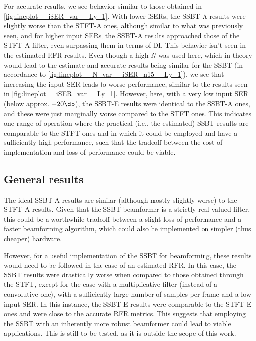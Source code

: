 For accurate results, we see behavior similar to those obtained in \cref{fig:lineplot__iSER_var__Ly_1}. With lower iSERs, the SSBT-A results were slightly worse than the STFT-A ones, although similar to what was previously seen, and for higher input SERs, the SSBT-A results approached those of the STFT-A filter, even surpassing them in terms of DI. This behavior isn't seen in the estimated RFR results. Even though a high $N$ was used here, which in theory would lead to the estimate and accurate results being similar for the SSBT (in accordance to \cref{fig:lineplot__N_var__iSER_n15__Ly_1}), we see that increasing the input SER leads to worse performance, similar to the results seen in \cref{fig:lineplot__iSER_var__Ly_1}. However, here, with a very low input SER (below approx. $-20 \dB$), the SSBT-E results were identical to the SSBT-A ones, and these were just marginally worse compared to the STFT ones. This indicates one range of operation where the practical (i.e., the estimated) SSBT results are comparable to the STFT ones and in which it could be employed and have a sufficiently high performance, such that the tradeoff between the cost of implementation and loss of performance could be viable.


\subsection{General results}

The ideal SSBT-A results are similar (although mostly slightly worse) to the STFT-A results. Given that the SSBT beamformer is a strictly real-valued filter, this could be a worthwhile tradeoff between a slight loss of performance and a faster beamforming algorithm, which could also be implemented on simpler (thus cheaper) hardware.

However, for a useful implementation of the SSBT for beamforming, these results would need to be followed in the case of an estimated  RFR. In this case, the SSBT results were drastically worse when compared to those obtained through the STFT, except for the case with a multiplicative filter (instead of a convolutive one), with a sufficiently large number of samples per frame and a low input SER. In this instance, the SSBT-E results were comparable to the STFT-E ones and were close to the accurate RFR metrics. This suggests that employing the SSBT with an inherently more robust beamformer could lead to viable applications. This is still to be tested, as it is outside the scope of this work.